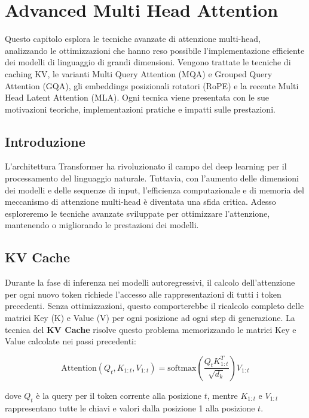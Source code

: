\chapter{Advanced Multi Head Attention}
Questo capitolo esplora le tecniche avanzate di attenzione multi-head, analizzando le ottimizzazioni che hanno reso possibile l'implementazione efficiente dei modelli di linguaggio di grandi dimensioni. Vengono trattate le tecniche di caching KV, le varianti Multi Query Attention (MQA) e Grouped Query Attention (GQA), gli embeddings posizionali rotatori (RoPE) e la recente Multi Head Latent Attention (MLA). Ogni tecnica viene presentata con le sue motivazioni teoriche, implementazioni pratiche e impatti sulle prestazioni.


\section{Introduzione}

L'architettura Transformer ha rivoluzionato il campo del deep learning per il processamento del linguaggio naturale. Tuttavia, con l'aumento delle dimensioni dei modelli e delle sequenze di input, l'efficienza computazionale e di memoria del meccanismo di attenzione multi-head è diventata una sfida critica. Adesso esploreremo le tecniche avanzate sviluppate per ottimizzare l'attenzione, mantenendo o migliorando le prestazioni dei modelli.

\section{KV Cache}

Durante la fase di inferenza nei modelli autoregressivi, il calcolo dell'attenzione per ogni nuovo token richiede l'accesso alle rappresentazioni di tutti i token precedenti. Senza ottimizzazioni, questo comporterebbe il ricalcolo completo delle matrici Key (K) e Value (V) per ogni posizione ad ogni step di generazione. La tecnica del \textbf{KV Cache} risolve questo problema memorizzando le matrici Key e Value calcolate nei passi precedenti:

\begin{equation}
\text{Attention}(Q_t, K_{1:t}, V_{1:t}) = \text{softmax}\left(\frac{Q_t K_{1:t}^T}{\sqrt{d_k}}\right) V_{1:t}
\end{equation}

dove $Q_t$ è la query per il token corrente alla posizione $t$, mentre $K_{1:t}$ e $V_{1:t}$ rappresentano tutte le chiavi e valori dalla posizione 1 alla posizione $t$.


